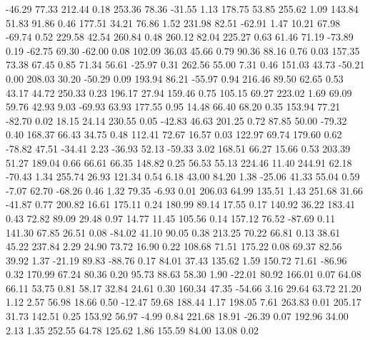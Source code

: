   -46.29   77.33  212.44    0.18
  253.36   78.36  -31.55    1.13
  178.75   53.85  255.62    1.09
  143.84   51.83   91.86    0.46
  177.51   34.21   76.86    1.52
  231.98   82.51  -62.91    1.47
   10.21   67.98  -69.74    0.52
  229.58   42.54  260.84    0.48
  260.12   82.04  225.27    0.63
   61.46   71.19  -73.89    0.19
  -62.75   69.30  -62.00    0.08
  102.09   36.03   45.66    0.79
   90.36   88.16    0.76    0.03
  157.35   73.38   67.45    0.85
   71.34   56.61  -25.97    0.31
  262.56   55.00    7.31    0.46
  151.03   43.73  -50.21    0.00
  208.03   30.20  -50.29    0.09
  193.94   86.21  -55.97    0.94
  216.46   89.50   62.65    0.53
   43.17   44.72  250.33    0.23
  196.17   27.94  159.46    0.75
  105.15   69.27  223.02    1.69
   69.09   59.76   42.93    9.03
  -69.93   63.93  177.55    0.95
   14.48   66.40   68.20    0.35
  153.94   77.21  -82.70    0.02
   18.15   24.14  230.55    0.05
  -42.83   46.63  201.25    0.72
   87.85   50.00  -79.32    0.40
  168.37   66.43   34.75    0.48
  112.41   72.67   16.57    0.03
  122.97   69.74  179.60    0.62
  -78.82   47.51  -34.41    2.23
  -36.93   52.13  -59.33    3.02
  168.51   66.27   15.66    0.53
  203.39   51.27  189.04    0.66
   66.61   66.35  148.82    0.25
   56.53   55.13  224.46   11.40
  244.91   62.18  -70.43    1.34
  255.74   26.93  121.34    0.54
    6.18   43.00   84.20    1.38
  -25.06   41.33   55.04    0.59
   -7.07   62.70  -68.26    0.46
    1.32   79.35   -6.93    0.01
  206.03   64.99  135.51    1.43
  251.68   31.66  -41.87    0.77
  200.82   16.61  175.11    0.24
  180.99   89.14   17.55    0.17
  140.92   36.22  183.41    0.43
   72.82   89.09   29.48    0.97
   14.77   11.45  105.56    0.14
  157.12   76.52  -87.69    0.11
  141.30   67.85   26.51    0.08
  -84.02   41.10   90.05    0.38
  213.25   70.22   66.81    0.13
   38.61   45.22  237.84    2.29
   24.90   73.72   16.90    0.22
  108.68   71.51  175.22    0.08
   69.37   82.56   39.92    1.37
  -21.19   89.83  -88.76    0.17
   84.01   37.43  135.62    1.59
  150.72   71.61  -86.96    0.32
  170.99   67.24   80.36    0.20
   95.73   88.63   58.30    1.90
  -22.01   80.92  166.01    0.07
   64.08   66.11   53.75    0.81
   58.17   32.84   24.61    0.30
  160.34   47.35  -54.66    3.16
   29.64   63.72   21.20    1.12
    2.57   56.98   18.66    0.50
  -12.47   59.68  188.44    1.17
  198.05    7.61  263.83    0.01
  205.17   31.73  142.51    0.25
  153.92   56.97   -4.99    0.84
  221.68   18.91  -26.39    0.07
  192.96   34.00    2.13    1.35
  252.55   64.78  125.62    1.86
  155.59   84.00   13.08    0.02
